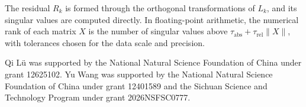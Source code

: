 \documentclass[twocolumn]{autart}
\begin{document}
The residual $R_k$ is formed through the orthogonal transformations of $L_k$, and its singular values are computed directly. In floating-point arithmetic, the numerical rank of each matrix $X$ is the number of singular values above $\tau_{\mathrm{abs}}+\tau_{\mathrm{rel}}\lVert X\rVert$, with tolerances chosen for the data scale and precision.





\begin{ack}
Qi L\"u was supported by the National Natural Science Foundation of China
under grant 12625102. Yu Wang was supported by the National Natural Science
Foundation of China under grant 12401589 and the Sichuan Science and
Technology Program under grant 2026NSFSC0777.
\end{ack}



\end{document}
